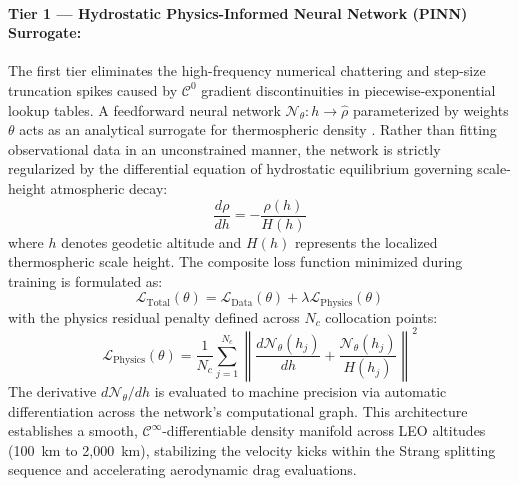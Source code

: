 \paragraph{Tier 1 --- Hydrostatic Physics-Informed Neural Network (PINN) Surrogate:}
The first tier eliminates the high-frequency numerical chattering and step-size truncation spikes caused by $\mathcal{C}^0$ gradient discontinuities in piecewise-exponential lookup tables. A feedforward neural network $\mathcal{N}_\theta: h \to \hat{\rho}$ parameterized by weights $\theta$ acts as an analytical surrogate for thermospheric density \cite{raissi_physics-informed_2019}. Rather than fitting observational data in an unconstrained manner, the network is strictly regularized by the differential equation of hydrostatic equilibrium governing scale-height atmospheric decay:
\begin{equation}
\frac{d\rho}{dh} = -\frac{\rho(h)}{H(h)}
\label{eq:hydrostatic_ode}
\end{equation}
where $h$ denotes geodetic altitude and $H(h)$ represents the localized thermospheric scale height. The composite loss function minimized during training is formulated as:
\begin{equation}
\mathcal{L}_{\text{Total}}(\theta) = \mathcal{L}_{\text{Data}}(\theta) + \lambda \mathcal{L}_{\text{Physics}}(\theta)
\label{eq:pinn_total_loss}
\end{equation}
with the physics residual penalty defined across $N_c$ collocation points:
\begin{equation}
\mathcal{L}_{\text{Physics}}(\theta) = \frac{1}{N_c} \sum_{j=1}^{N_c} \left\| \frac{d\mathcal{N}_\theta(h_j)}{dh} + \frac{\mathcal{N}_\theta(h_j)}{H(h_j)} \right\|^2
\label{eq:pinn_physics_residual}
\end{equation}
The derivative $d\mathcal{N}_\theta / dh$ is evaluated to machine precision via automatic differentiation across the network's computational graph. This architecture establishes a smooth, $\mathcal{C}^\infty$-differentiable density manifold across LEO altitudes (100~km to 2,000~km), stabilizing the velocity kicks within the Strang splitting sequence and accelerating aerodynamic drag evaluations.

